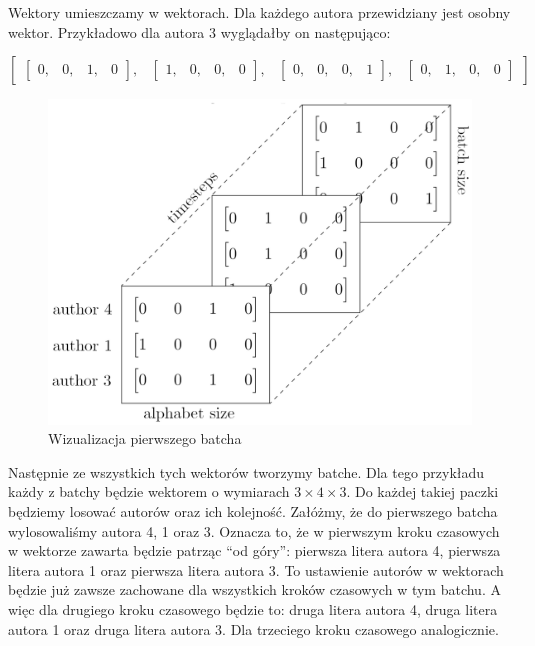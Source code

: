 Wektory umieszczamy w wektorach. Dla każdego autora przewidziany jest osobny wektor. 
Przykładowo dla autora 3 wyglądałby on następująco:
\vspace{3mm}

$
\begin{bmatrix} \begin{bmatrix} 0, & 0, & 1, & 0\end{bmatrix},  & \begin{bmatrix} 1, & 0, & 0, & 0\end{bmatrix}, & \begin{bmatrix} 0, & 0, & 0, & 1\end{bmatrix}, & \begin{bmatrix} 0, & 1, & 0, & 0\end{bmatrix} \end{bmatrix}
$



\begin{figure}
\vspace{-4mm}
\includegraphics[width=\linewidth]{./images/batch.png}
\caption{Wizualizacja pierwszego batcha}
\label{fig:test2}
\vspace{-4mm}
\end{figure}
\vspace{4mm}
Następnie ze wszystkich tych wektorów tworzymy batche.
Dla tego przykładu każdy z batchy będzie wektorem o wymiarach $3 \times 4 \times 3$.
Do każdej takiej paczki będziemy losować autorów oraz ich kolejność. Załóżmy, że do pierwszego batcha
wylosowaliśmy autora 4, 1 oraz 3. Oznacza to, że w pierwszym kroku czasowych w wektorze zawarta będzie 
patrząc ``od góry'': pierwsza litera autora 4, pierwsza litera autora 1 oraz pierwsza litera autora 3.
To ustawienie autorów w wektorach będzie już zawsze zachowane dla wszystkich kroków czasowych w tym batchu. 
A więc dla drugiego kroku czasowego będzie to: druga litera autora 4, druga litera autora 1 oraz druga 
litera autora 3. Dla trzeciego kroku czasowego analogicznie. 

